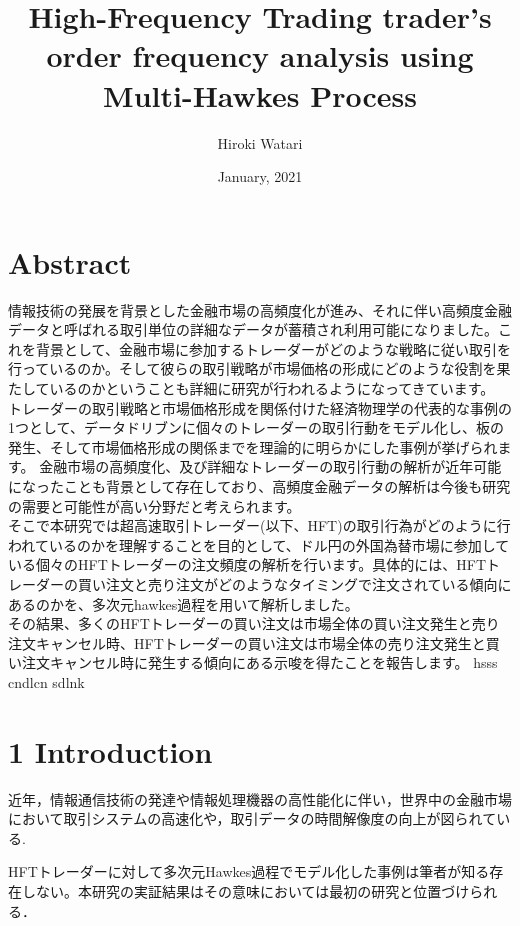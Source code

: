 \documentclass[a4paper,11pt,oneside,openany]{book}
\title{High-Frequency Trading trader's order frequency analysis using Multi-Hawkes Process}
\author{Hiroki Watari}
\affiliation{%
  Graduate Major in Artificial Intelligence\\
  School of Computing\\
  Tokyo Institute of Technology}
\date{January, 2021}
\begin{document}
\frontmatter
\maketitle
\chapter{Abstract}
情報技術の発展を背景とした金融市場の高頻度化が進み、それに伴い高頻度金融データと呼ばれる取引単位の詳細なデータが蓄積され利用可能になりました。これを背景として、金融市場に参加するトレーダーがどのような戦略に従い取引を行っているのか。そして彼らの取引戦略が市場価格の形成にどのような役割を果たしているのかということも詳細に研究が行われるようになってきています。\\
トレーダーの取引戦略と市場価格形成を関係付けた経済物理学の代表的な事例の1つとして、データドリブンに個々のトレーダーの取引行動をモデル化し、板の発生、そして市場価格形成の関係までを理論的に明らかにした事例が挙げられます。 金融市場の高頻度化、及び詳細なトレーダーの取引行動の解析が近年可能になったことも背景として存在しており、高頻度金融データの解析は今後も研究の需要と可能性が高い分野だと考えられます。\\
そこで本研究では超高速取引トレーダー(以下、HFT)の取引行為がどのように行われているのかを理解することを目的として、ドル円の外国為替市場に参加している個々のHFTトレーダーの注文頻度の解析を行います。具体的には、HFTトレーダーの買い注文と売り注文がどのようなタイミングで注文されている傾向にあるのかを、多次元hawkes過程を用いて解析しました。\\
その結果、多くのHFTトレーダーの買い注文は市場全体の買い注文発生と売り注文キャンセル時、HFTトレーダーの買い注文は市場全体の売り注文発生と買い注文キャンセル時に発生する傾向にある示唆を得たことを報告します。
hsss
cndlcn
sdlnk

\tableofcontents

\chapter{1 Introduction}
近年，情報通信技術の発達や情報処理機器の高性能化に伴い，世界中の金融市場において取引システムの高速化や，取引データの時間解像度の向上が図られている.

HFTトレーダーに対して多次元Hawkes過程でモデル化した事例は筆者が知る存在しない。本研究の実証結果はその意味においては最初の研究と位置づけられる．
\end{document}
